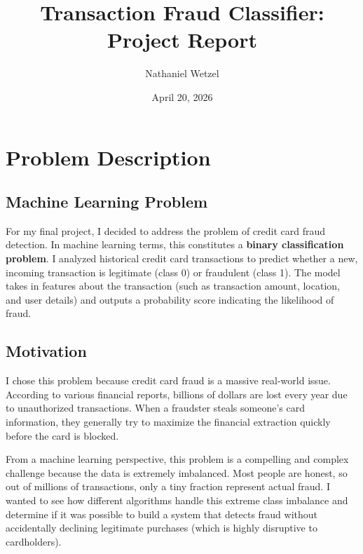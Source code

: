 \documentclass[11pt]{article}
\title{\textbf{Transaction Fraud Classifier: Project Report}}
\author{Nathaniel Wetzel}
\date{April 20, 2026}
\begin{document}
\maketitle

\section{Problem Description}

\subsection{Machine Learning Problem}
For my final project, I decided to address the problem of credit card fraud detection. In machine learning terms, this constitutes a \textbf{binary classification problem}. I analyzed historical credit card transactions to predict whether a new, incoming transaction is legitimate (class 0) or fraudulent (class 1). The model takes in features about the transaction (such as transaction amount, location, and user details) and outputs a probability score indicating the likelihood of fraud.

\subsection{Motivation}
I chose this problem because credit card fraud is a massive real-world issue. According to various financial reports, billions of dollars are lost every year due to unauthorized transactions. When a fraudster steals someone's card information, they generally try to maximize the financial extraction quickly before the card is blocked. 

From a machine learning perspective, this problem is a compelling and complex challenge because the data is extremely imbalanced. Most people are honest, so out of millions of transactions, only a tiny fraction represent actual fraud. I wanted to see how different algorithms handle this extreme class imbalance and determine if it was possible to build a system that detects fraud without accidentally declining legitimate purchases (which is highly disruptive to cardholders).
\end{document}
